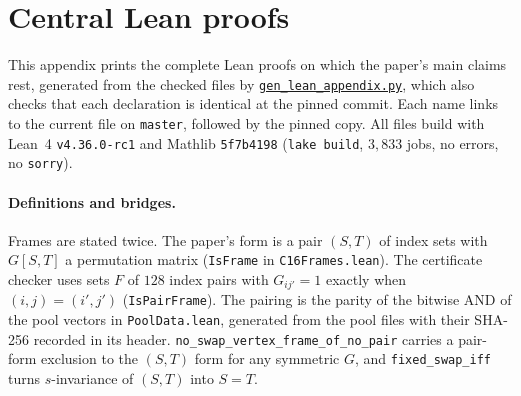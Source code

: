 \documentclass[11pt]{article}
\theoremstyle{definition}
\theoremstyle{remark}
\newcommand{\repourl}{https://github.com/alectionary/vibe-math}
\newcommand{\cdir}{formalization/canonical-width/c16}
\begin{document}
\section{Central Lean proofs}\label{app:lean}
This appendix prints the complete Lean proofs on which the paper's main claims rest, generated from the checked files by \href{\repourl/blob/master/\cdir/paper/gen_lean_appendix.py}{\texttt{gen\_lean\_appendix.py}}, which also checks that each declaration is identical at the pinned commit. Each name links to the current file on \texttt{master}, followed by the pinned copy. All files build with Lean~4 \texttt{v4.36.0-rc1} and Mathlib \texttt{5f7b4198} (\texttt{lake build}, $3{,}833$ jobs, no errors, no \texttt{sorry}).

\paragraph{Definitions and bridges.} Frames are stated twice. The paper's form is a pair $(S,T)$ of index sets with $G[S,T]$ a permutation matrix (\texttt{IsFrame} in \texttt{C16Frames.lean}). The certificate checker uses sets $F$ of $128$ index pairs with $G_{ij'}=1$ exactly when $(i,j)=(i',j')$ (\texttt{IsPairFrame}). The pairing is the parity of the bitwise AND of the pool vectors in \texttt{PoolData.lean}, generated from the pool files with their SHA-256 recorded in its header. \texttt{no\_swap\_vertex\_frame\_of\_no\_pair} carries a pair-form exclusion to the $(S,T)$ form for any symmetric $G$, and \texttt{fixed\_swap\_iff} turns $s$-invariance of $(S,T)$ into $S=T$.
\end{document}
